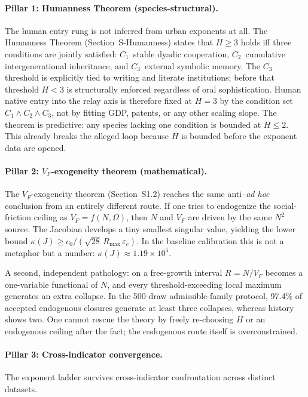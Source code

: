 \documentclass[11pt]{article}
\begin{document}
\paragraph{Pillar 1: Humanness Theorem (species-structural).}
The human entry rung is not inferred from urban exponents at all.
The Humanness Theorem (Section~S-Humanness) states that $H \geq 3$ holds iff three conditions are jointly satisfied:
$C_1$~stable dyadic cooperation, $C_2$~cumulative intergenerational inheritance, and $C_3$~external symbolic memory.
The $C_3$ threshold is explicitly tied to writing and literate institutions; before that threshold $H<3$ is structurally enforced regardless of oral sophistication.
Human native entry into the relay axis is therefore fixed at $H=3$ by the condition set $C_1 \wedge C_2 \wedge C_3$, not by fitting GDP, patents, or any other scaling slope.
The theorem is predictive: any species lacking one condition is bounded at $H \leq 2$.
This already breaks the alleged loop because $H$ is bounded before the exponent data are opened.

\paragraph{Pillar 2: $V_F$-exogeneity theorem (mathematical).}
The $V_F$-exogeneity theorem (Section~S1.2) reaches the same anti--\emph{ad hoc} conclusion from an entirely different route.
If one tries to endogenize the social-friction ceiling as $V_F = f(N, \Omega)$, then $N$ and $V_F$ are driven by the same $N^2$ source.
The Jacobian develops a tiny smallest singular value, yielding the lower bound $\kappa(J) \geq c_0 / (\sqrt{28}\,R_{\max}\,\varepsilon_c)$.
In the baseline calibration this is not a metaphor but a number: $\kappa(J) \approx 1.19 \times 10^5$.

A second, independent pathology: on a free-growth interval $R = N/V_F$ becomes a one-variable functional of $N$, and every threshold-exceeding local maximum generates an extra collapse.
In the 500-draw admissible-family protocol, 97.4\% of accepted endogenous closures generate at least three collapses, whereas history shows two.
One cannot rescue the theory by freely re-choosing $H$ or an endogenous ceiling after the fact; the endogenous route itself is overconstrained.

\paragraph{Pillar 3: Cross-indicator convergence.}
The exponent ladder survives cross-indicator confrontation across distinct datasets.
\end{document}

